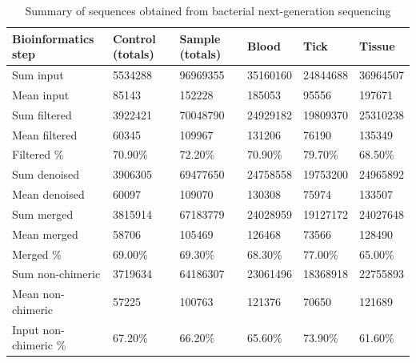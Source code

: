 \documentclass[a4paper, nobind]{templates/ociamthesis}
\begin{document}
\begin{table}[!h]

\caption[Summary of sequences obtained from bacterial amplicon sequencing.]{\label{tab:TA31}Summary of sequences obtained from bacterial next-generation sequencing}
\centering
\fontsize{8.5}{10.5}\selectfont
\begin{tabular}[t]{llllll}
\toprule
Bioinformatics step & Control (totals) & Sample (totals) & Blood & Tick & Tissue\\
\midrule
Sum input & 5534288 & 96969355 & 35160160 & 24844688 & 36964507\\
Mean input & 85143 & 152228 & 185053 & 95556 & 197671\\
Sum filtered & 3922421 & 70048790 & 24929182 & 19809370 & 25310238\\
Mean filtered & 60345 & 109967 & 131206 & 76190 & 135349\\
Filtered \% & 70.90\% & 72.20\% & 70.90\% & 79.70\% & 68.50\%\\
Sum denoised & 3906305 & 69477650 & 24758558 & 19753200 & 24965892\\
Mean denoised & 60097 & 109070 & 130308 & 75974 & 133507\\
Sum merged & 3815914 & 67183779 & 24028959 & 19127172 & 24027648\\
Mean merged & 58706 & 105469 & 126468 & 73566 & 128490\\
Merged \% & 69.00\% & 69.30\% & 68.30\% & 77.00\% & 65.00\%\\
Sum non-chimeric & 3719634 & 64186307 & 23061496 & 18368918 & 22755893\\
Mean non-chimeric & 57225 & 100763 & 121376 & 70650 & 121689\\
Input non-chimeric \% & 67.20\% & 66.20\% & 65.60\% & 73.90\% & 61.60\%\\
\bottomrule
\end{tabular}
\end{table}

\newpage
\end{document}
